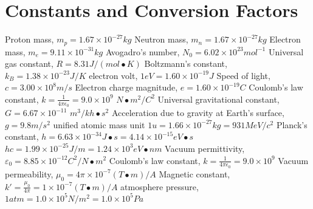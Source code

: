 \documentclass[11pt]{article}
\begin{document}
    \section{Constants and Conversion Factors}
    Proton mass, $m_{p} = 1.67 \times 10^{-27} kg$\newline
    Neutron mass, $m_{n} = 1.67 \times 10^{-27} kg$\newline
    Electron mass, $m_e = 9.11 \times 10^{-31} kg$\newline
    Avogadro's number, $N_{0} = 6.02 \times 10^{23} mol^{-1}$\newline
    Universal gas constant, $R = 8.31 J/(mol\bullet K)$\newline
    Boltzmann's constant, $k_{B} = 1.38 \times 10^{-23} J/K$ electron volt, $1 eV = 1.60 \times 10^{-19} J$\newline
    Speed of light, $c = 3.00 \times 10^{8} m/s$\newline
    Electron charge magnitude, $e = 1.60 \times 10^{-19} C$\newline
    Coulomb's law constant, $k = \frac{1}{4\pi \epsilon_{0}} = 9.0 \times 10^{9}$ $N\bullet m^{2} / C^{2}$\newline
    Universal gravitational constant, $G = 6.67 \times 10^{-11}$ $m^{3}/kh\bullet s^{2}$\newline
    Acceleration due to gravity at Earth's surface, $g = 9.8 m/s^{2}$ unified atomic mass unit $1 u = 1.66 \times 10^{-27} kg = 931 MeV/c^{2}$\newline
    Planck's constant, $h = 6.63 \times 10^{-34} J\bullet s = 4.14 \times 10^{-15} eV\bullet s$\newline
    $hc = 1.99 \times 10^{-25} J/m = 1.24 \times 10^{3} eV\bullet nm$\newline
    Vacuum permittivity, $\varepsilon_{0} = 8.85 \times 10^{-12} C^{2}/N\bullet m^{2}$\newline
    Coulomb's law constant, $k = \frac{1}{4\pi \epsilon_{0}} = 9.0 \times 10^{9}$\newline
    Vacuum permeability, $\mu_{0} = 4\pi \times 10^{-7} (T\bullet m)/A$\newline
    Magnetic constant, $k' = \frac{\mu_{0}}{4\pi} = 1 \times 10^{-7} (T\bullet m)/A$ atmosphere pressure, $1 atm = 1.0 \times 10^{5} N/m^{2} = 1.0 \times 10^{5} Pa$
\end{document}
